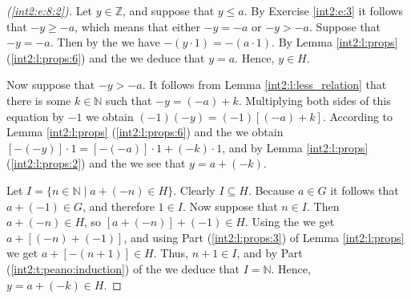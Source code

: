 \begin{proof}[(\ref{int2:e:8:2})]
	Let $y \in \mathbb{Z}$, and suppose that $y \leq a$. By Exercise \ref{int2:e:3} it follows that ${-y \geq -a}$, which means that either $-y = -a$ or $-y > -a$. Suppose that $-y = -a$. Then by the  we have $-(y \cdot 1) = -(a \cdot 1)$. By Lemma \ref{int2:l:props} (\ref{int2:l:props:6}) and the  we deduce that $y = a$. Hence, $y \in H$.

	Now suppose that $-y > -a$. It follows from Lemma \ref{int2:l:less_relation} that there is some ${k \in \mathbb{N}}$ such that $-y = (-a) + k$. Multiplying both sides of this equation by $-1$ we obtain ${(-1)(-y) = (-1)[(-a) + k]}$. According to Lemma \ref{int2:l:props} (\ref{int2:l:props:6}) and the  we obtain $[-(-y)] \cdot 1 = [-(-a)] \cdot 1 + (-k) \cdot 1$, and by Lemma \ref{int2:l:props} (\ref{int2:l:props:2}) and the  we see that $y = a + (-k)$.

	Let $I = \{ n \in \mathbb{N} \mid a + (-n) \in H \}$. Clearly $I \subseteq H$. Because $a \in G$ it follows that $a + (-1) \in G$, and therefore $1 \in I$. Now suppose that $n \in I$. Then $a + (-n) \in H$, so $[a + (-n)] + (-1) \in H$. Using the  we get $a + [(-n) + (-1)]$, and using Part (\ref{int2:l:props:3}) of Lemma \ref{int2:l:props} we get $a + [-(n + 1)] \in H$. Thus, $n + 1 \in I$, and by Part (\ref{int2:t:peano:induction}) of the  we deduce that $I = \mathbb{N}$. Hence, $y = a + (-k) \in H$.
\end{proof}
